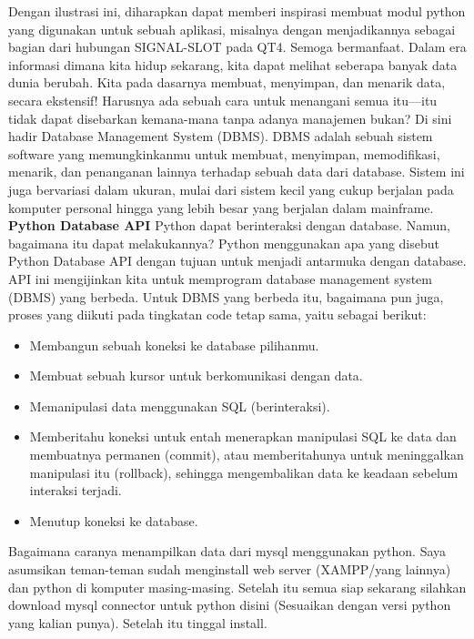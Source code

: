 Dengan ilustrasi ini, diharapkan dapat memberi inspirasi membuat modul python yang digunakan untuk sebuah aplikasi, misalnya dengan menjadikannya sebagai bagian dari hubungan SIGNAL-SLOT pada QT4. Semoga bermanfaat. 
\vspace{12pt}
Dalam era informasi dimana kita hidup sekarang, kita dapat melihat seberapa banyak data dunia berubah. Kita pada dasarnya membuat, menyimpan, dan menarik data, secara ekstensif! Harusnya ada sebuah cara untuk menangani semua itu—itu tidak dapat disebarkan kemana-mana tanpa adanya manajemen bukan? Di sini hadir Database Management System (DBMS). DBMS adalah sebuah sistem software yang memungkinkanmu untuk membuat, menyimpan, memodifikasi, menarik, dan penanganan lainnya terhadap sebuah data dari database. Sistem ini juga bervariasi dalam ukuran, mulai dari sistem kecil yang cukup berjalan pada komputer personal hingga yang lebih besar yang berjalan dalam mainframe. 
\vspace{12pt}
\noindent 
\textbf{Python Database API} 
Python dapat berinteraksi dengan database. Namun, bagaimana itu dapat melakukannya? Python menggunakan apa yang disebut Python Database API dengan tujuan untuk menjadi antarmuka dengan database. API ini mengijinkan kita untuk memprogram database management system (DBMS) yang berbeda. Untuk DBMS yang berbeda itu, bagaimana pun juga, proses yang diikuti pada tingkatan code tetap sama, yaitu sebagai berikut: 
\vspace{12pt}
\noindent 
\begin{itemize}
\item Membangun sebuah koneksi ke database pilihanmu. 
\noindent 
\item Membuat sebuah kursor untuk berkomunikasi dengan data. 
\noindent 
\item Memanipulasi data menggunakan SQL (berinteraksi). 
\noindent 
\item Memberitahu koneksi untuk entah menerapkan manipulasi SQL ke data dan membuatnya permanen (commit), atau memberitahunya untuk meninggalkan manipulasi itu (rollback), sehingga mengembalikan data ke keadaan sebelum interaksi terjadi. 
\noindent 
\item Menutup koneksi ke database.\end{itemize}
Bagaimana caranya menampilkan data dari mysql menggunakan python. Saya asumsikan teman-teman sudah menginstall web server (XAMPP/yang lainnya) dan python di komputer masing-masing. Setelah itu semua siap sekarang silahkan download mysql connector untuk python disini (Sesuaikan dengan versi python yang kalian punya). Setelah itu tinggal install. 
